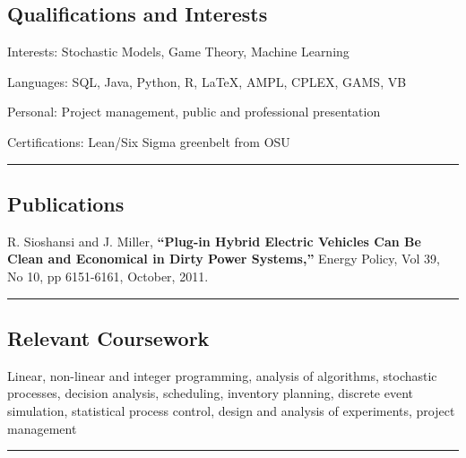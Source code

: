 \documentclass[10pt,letterpaper]{article}
\newenvironment{indentsection}[1]%
{\begin{list}{}%
	{\setlength{\leftmargin}{#1}}%
	\item[]%
}
{\end{list}}
\begin{document}
\subsection*{Qualifications and Interests}
\begin{indentsection}{\parindent}
\begin{description*}
	\item[Interests:]
	Stochastic Models, Game Theory, Machine Learning
	\item[Languages:]
	SQL, Java, Python, R, \LaTeX, AMPL, CPLEX, GAMS, VB
	\item[Personal:]
	Project management, public and professional presentation
	\item[Certifications:]
	Lean/Six Sigma greenbelt from OSU
\end{description*}
\end{indentsection}
\hrule
\vspace{-0.4em}
\subsection*{Publications}
\begin{indentsection}{\parindent}
R. Sioshansi and J. Miller, {\bf ``Plug-in Hybrid Electric Vehicles Can Be Clean and Economical in Dirty Power Systems,''} Energy Policy, Vol 39, No 10, pp 6151-6161, October, 2011.
\end{indentsection}
\hrule
\vspace{-0.4em}
\subsection*{Relevant Coursework}
Linear, non-linear and integer programming, analysis of algorithms, stochastic processes,  decision analysis, scheduling, inventory planning, discrete event simulation, statistical process control, design and analysis of experiments, project management \\
\hrule
\vspace{-0.4em}
\end{document}
